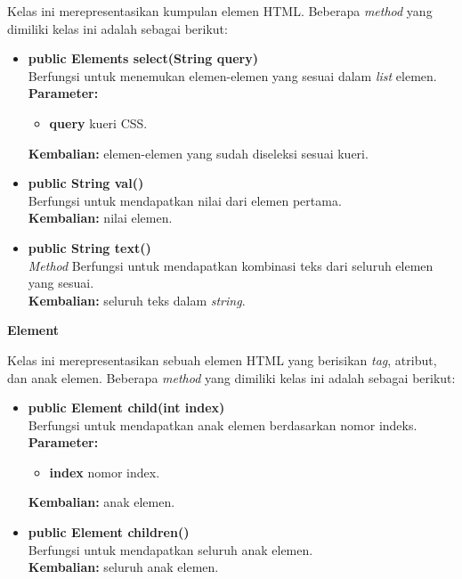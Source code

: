 \documentclass[a4paper,twoside]{article}
\begin{document}
\begin{enumerate}
\begin{enumerate}
Kelas ini merepresentasikan kumpulan elemen HTML. Beberapa \textit{method} yang dimiliki kelas ini adalah sebagai berikut:
\begin{itemize}
	\item \textbf{public Elements select(String query)} \\
		Berfungsi untuk menemukan elemen-elemen yang sesuai dalam \textit{list} elemen. \\
		\textbf{Parameter:} 
		\begin{itemize}
			\item \textbf{query} kueri CSS.
		\end{itemize}
		\textbf{Kembalian:} elemen-elemen yang sudah diseleksi sesuai kueri.	
		
		\item \textbf{public String val()} \\
		Berfungsi untuk mendapatkan nilai dari elemen pertama. \\
		\textbf{Kembalian:} nilai elemen.	
		
		\item \textbf{public String text()} \\
		\textit{Method} Berfungsi untuk mendapatkan kombinasi teks dari seluruh elemen yang sesuai. \\
		\textbf{Kembalian:} seluruh teks dalam \textit{string}.	
\end{itemize}

\textbf{Element}

Kelas ini merepresentasikan sebuah elemen HTML yang berisikan \textit{tag}, atribut, dan anak elemen. Beberapa \textit{method} yang dimiliki kelas ini adalah sebagai berikut:
\begin{itemize}
	\item \textbf{public Element child(int index)} \\
		Berfungsi untuk mendapatkan anak elemen berdasarkan nomor indeks. \\
		\textbf{Parameter:} 
		\begin{itemize}
			\item \textbf{index} nomor index.
		\end{itemize}
		\textbf{Kembalian:} anak elemen.	
		
		\item \textbf{public Element children()} \\
		Berfungsi untuk mendapatkan seluruh anak elemen. \\
		\textbf{Kembalian:} seluruh anak elemen.	
		

\end{itemize}
\end{enumerate}
\end{enumerate}
\end{document}
